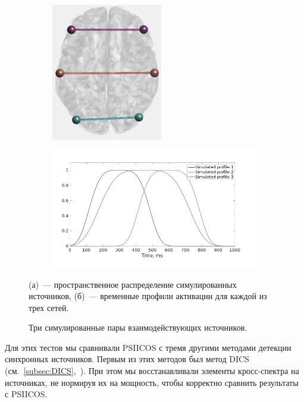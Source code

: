 \begin{figure}[htbp]
    \begin{subfigure}[t]{0.5\textwidth}
        \centering
        \includegraphics[angle = 90, height = 6cm]{../images/psiicos_paper/Figure2a_hr.jpg}\label{fig:2a}
        \caption{}
    \end{subfigure}
    \begin{subfigure}[t]{0.5\textwidth}
        \centering
        \includegraphics[width=1\textwidth]{../images/psiicos_paper/Figure2b_hr.jpg}\label{fig:2b}
        \caption{}
    \end{subfigure}
    \caption{Три симулированные пары взаимодействующих источников.}\label{02}
        (а)~--- пространственное распределение симулированных источников,
        (б)~--- временные профили активации для каждой из трех сетей.
\end{figure}


Для этих тестов мы сравнивали PSIICOS с тремя другими методами детекции
синхронных источников. Первым из этих методов был метод DICS
(см.~\ref{subsec:DICS},~\cite{Gross2001}).  При этом мы восстанавливали
элементы кросс-спектра на источниках, не нормируя их на мощность, чтобы
корректно сравнить результаты с PSIICOS.\@

